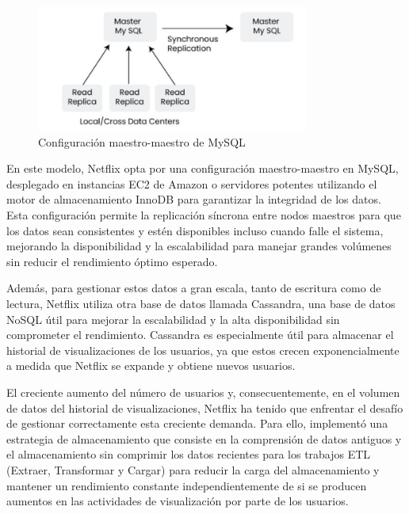 \documentclass[12pt,a4paper]{article}
\begin{document}
    \begin{figure}[H]
        \centering
        \includegraphics[width=0.8\textwidth]{./img/maestro_maestro_mysql.png}
        \caption{Configuración maestro-maestro de MySQL}
        \label{fig:netflix_mysql}
    \end{figure}

    En este modelo, Netflix opta por una configuración maestro-maestro en MySQL, desplegado en instancias EC2 de Amazon o servidores potentes utilizando el motor de almacenamiento InnoDB para garantizar la integridad de los datos. Esta configuración permite la replicación síncrona entre nodos maestros para que los datos sean consistentes y estén disponibles incluso cuando falle el sistema, mejorando la disponibilidad y la escalabilidad para manejar grandes volúmenes sin reducir el rendimiento óptimo esperado.

    Además, para gestionar estos datos a gran escala, tanto de escritura como de lectura, Netflix utiliza otra base de datos llamada Cassandra, una base de datos NoSQL útil para mejorar la escalabilidad y la alta disponibilidad sin comprometer el rendimiento. Cassandra es especialmente útil para almacenar el historial de visualizaciones de los usuarios, ya que estos crecen exponencialmente a medida que Netflix se expande y obtiene nuevos usuarios.

    El creciente aumento del número de usuarios y, consecuentemente, en el volumen de datos del historial de visualizaciones, Netflix ha tenido que enfrentar el desafío de gestionar correctamente esta creciente demanda. Para ello, implementó una estrategia de almacenamiento que consiste en la comprensión de datos antiguos y el almacenamiento sin comprimir los datos recientes para los trabajos ETL (Extraer, Transformar y Cargar) para reducir la carga del almacenamiento y mantener un rendimiento constante independientemente de si se producen aumentos en las actividades de visualización por parte de los usuarios.
\end{document}
